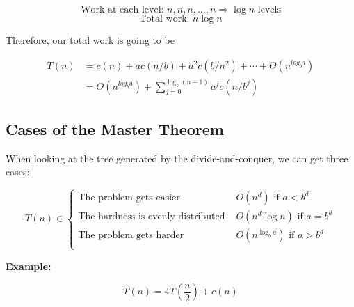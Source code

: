 \begin{center}
\end{center}

\[
    \text{Work at each level: } n, n, n, \ldots, n \Rightarrow \log n \text{ levels}
\]
\[
    \text{Total work: } n \log n
\]

Therefore, our total work is going to be 

\begin{align*}
    T(n) &= c(n) + a c(n/b) + a^2 c(b/n^2) + \cdots + \Theta(n^{log_b a})\\
         &=  \Theta(n^{log_b a}) + \sum_{j = 0}^{\log_b(n - 1)}a^j c (n/b^j)
\end{align*}

\subsection{Cases of the Master Theorem}

When looking at the tree generated by the divide-and-conquer, we can get three cases:

\[
    T(n) \in
    \begin{cases}
        \text{The problem gets easier } &O(n^d) \text{ if } a < b^d  \\
        \text{The hardness is evenly distributed } &O(n^d \log n) \text{ if } a = b^d \\
        \text{The problem gets harder } &O(n^{\log_{b}a}) \text{ if } a > b^d  \\
    \end{cases}
\]

\textbf{Example:}

\[
    T(n) = 4T (\frac{n}{2}) + c(n)
\]

